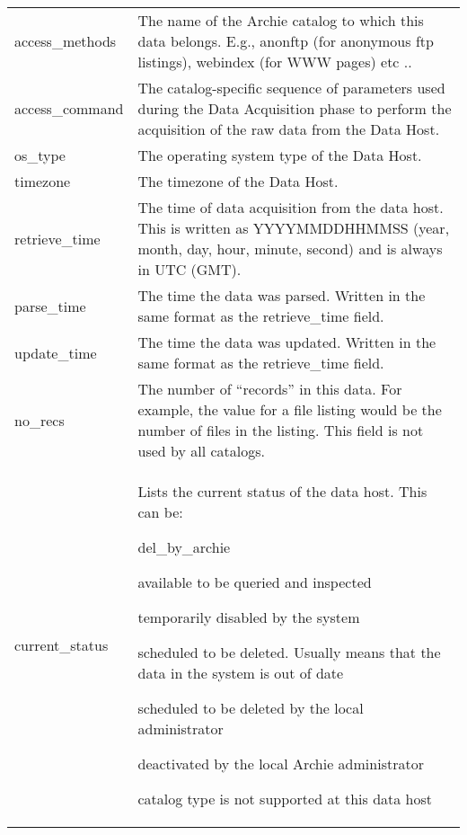 \begin{appendix}
\begin{longtable}[!]{lp{4.5in}}
access\_methods &
The name of the Archie catalog to which this data belongs. E.g., anonftp (for
anonymous ftp listings), webindex (for WWW pages) etc .. \\

access\_command &
The catalog-specific sequence of parameters used during the Data Acquisition
phase to perform the acquisition of the raw data from the Data Host. \\

os\_type & 
The operating system type of the Data Host. \\

timezone & 
The timezone of the Data Host. \\

retrieve\_time &
The time of data acquisition from the data host. This is written as
YYYYMMDDHHMMSS (year, month, day, hour, minute, second) and is always in UTC
(GMT). \\

parse\_time &
The time the data was parsed. Written in the same format as the retrieve\_time
field. \\

update\_time &
The time the data was updated. Written in the same format as the retrieve\_time
field. \\

no\_recs & 
The number of ``records'' in this data. For example, the value for a file
listing would be the number of files in the listing. This field is not used by
all catalogs. \\

current\_status &
Lists the current status of the data host. This can be:

\begin{TTentry}{del\_by\_archie}
\item[active]     available to be queried and inspected
\item[inactive]   temporarily disabled by the system
\item[del\_by\_archie]   scheduled to be deleted. Usually means that the data
in the system is out of date
\item[del\_by\_admin] scheduled to be deleted by the local administrator
\item[disabled] deactivated by the local Archie administrator
\item[not\_supported] catalog type is not supported at this data host
\end{TTentry} \\


\end{longtable}
\end{appendix}
